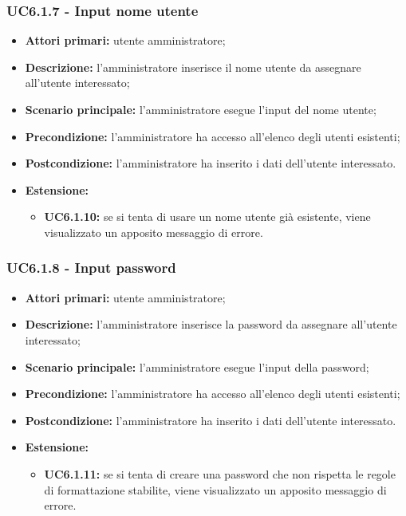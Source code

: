 \subsubsection{UC6.1.7 - Input nome utente}
	\begin{itemize}
		\item \textbf{Attori primari:} utente amministratore;
		\item \textbf{Descrizione:} l'amministratore inserisce il nome utente da assegnare all'utente interessato;
		\item \textbf{Scenario principale:} l'amministratore esegue l'input del nome utente;
		\item \textbf{Precondizione:} l'amministratore ha accesso all'elenco degli utenti esistenti;
		\item \textbf{Postcondizione:} l'amministratore ha inserito i dati dell'utente interessato.
		\item \textbf{Estensione:}
		\begin{itemize}
			\item \textbf{UC6.1.10:} se si tenta di usare un nome utente già esistente, viene visualizzato un apposito messaggio di errore.
		\end{itemize}
	\end{itemize}

\subsubsection{UC6.1.8 - Input password}
	\begin{itemize}
		\item \textbf{Attori primari:} utente amministratore;
		\item \textbf{Descrizione:} l'amministratore inserisce la password da assegnare all'utente interessato;
		\item \textbf{Scenario principale:} l'amministratore esegue l'input della password;
		\item \textbf{Precondizione:} l'amministratore ha accesso all'elenco degli utenti esistenti;
		\item \textbf{Postcondizione:} l'amministratore ha inserito i dati dell'utente interessato.
		\item \textbf{Estensione:}
		\begin{itemize}
			\item \textbf{UC6.1.11:} se si tenta di creare una password che non rispetta le regole di formattazione stabilite, viene visualizzato un apposito messaggio di errore.
		\end{itemize}
	\end{itemize}

